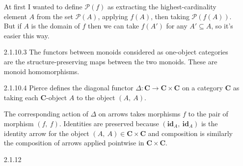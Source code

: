\documentclass{article}
\newcommand{\diag}{\Delta}
\newcommand{\ccat}{\mathbf{C}}
\newcommand{\id}{\mathbf{id}}
\newcommand{\pow}{\mathcal{P}}
\newcommand{\fpow}{\mathbf{\mathcal{P}}}
\begin{document}
\begin{enumerate}
  At first I wanted to define $\fpow(f)$ as extracting the highest-cardinality element $A$ from the set $\pow(A)$, applying $f(A)$, then taking $\pow(f(A))$.
  But if $A$ is the domain of $f$ then we can take $f(A')$ for any $A' \subseteq A$, so it's easier this way.
\item[]
\item[2.1.10.3] The functors between monoids considered as one-object categories are the structure-preserving maps between the two monoids.
  These are monoid homomorphisms.

\item[]
\item [2.1.10.4]
  Pierce defines the diagonal functor $\diag : \ccat \rightarrow \ccat \times \ccat$ on a category $\ccat$ as taking each $\ccat$-object $A$ to the object $(A,~A)$.
  
  The corresponding action of $\diag$ on arrows takes morphisms $f$ to the pair of morphism $(f,~f)$.
  Identities are preserved because $(\id_A,~\id_A)$ is the identity arrow for the object $(A,~A) \in \ccat \times \ccat$ and composition is similarly the composition of arrows applied pointwise in $\ccat \times \ccat$.

\item[]
\item [2.1.12]
\end{enumerate}
\end{document}
